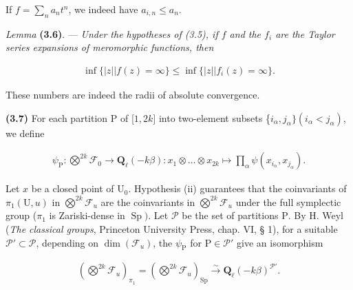 \documentclass[10pt,leqno]{article}
\begin{document}
\noindent If \(f=\sum _{n} a_{n} t^{n}\), we indeed have \(a_{i,n}\leq a_{n}\).\par

\noindent \emph{Lemma} \textbf{(3.6)}. — {\itshape Under the hypotheses of (3.5), if \(f\) and the \(f_{i}\) are the Taylor series expansions of meromorphic functions, then}\par

\begin{equation*}\begin{gathered}\operatorname{inf}\{|z| | f(z)=\infty \} \leq  \operatorname{inf}\{|z| | f_{i}(z)=\infty \}.\end{gathered}\end{equation*}

\noindent These numbers are indeed the radii of absolute convergence.\par

\clearpage

\label{physical-14}

\noindent \textbf{(3.7)} For each partition \(\mathrm{P}\) of [\(1,2k]\) into two-element subsets \{\(i_{\alpha },j_{\alpha }\} (i_{\alpha }<j_{\alpha })\), we define\par

\begin{equation*}\begin{gathered}\psi _{\mathrm{P}} : \bigotimes\limits^{2k}\mathcal{F} _{0} \longrightarrow  \mathbf{Q}_{\ell }(- k\beta ) : x_{1}\otimes \ldots \otimes x_{2k} \longmapsto  \prod _{\alpha } \psi (x_{i_{\alpha }},x_{j_{\alpha }}).\end{gathered}\end{equation*}

\noindent Let \(x\) be a closed point of \(\mathrm{U}_{0}\). Hypothesis (ii) guarantees that the coinvariants of \(\pi _{1}(\mathrm{U},u)\) in \(\bigotimes\limits^{2k}\mathcal{F} _{u}\) are the coinvariants in \(\bigotimes\limits^{2k}\mathcal{F} _{u}\) under the full symplectic group (\(\pi _{1}\) is Zariski-dense in \(\operatorname{Sp})\). Let \(\mathcal{P} \) be the set of partitions \(\mathrm{P}\). By \(\mathrm{H}\). Weyl (\emph{The classical groups}, Princeton University Press, chap. VI, § 1), for a suitable \(\mathcal{P} '\subset \mathcal{P} \), depending on \(\operatorname{dim}(\mathcal{F} _{u})\), the \(\psi _{\mathrm{P}}\) for \(\mathrm{P}\in \mathcal{P} '\) give an isomorphism\par

\begin{equation*}\begin{gathered}(\bigotimes\limits^{2k}\mathcal{F} _{u})_{\pi _{1}} = (\bigotimes\limits^{2k}\mathcal{F} _{u})_{\operatorname{Sp}} \xrightarrow{\sim } \mathbf{Q}_{\ell }(- k\beta )^{\mathcal{P} '}.\end{gathered}\end{equation*}
\end{document}
